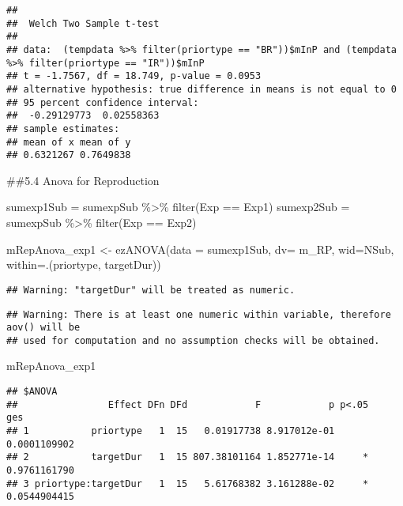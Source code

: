 \documentclass[
]{article}
\newenvironment{Shaded}{\begin{snugshade}}{\end{snugshade}}
\newcommand{\AttributeTok}[1]{\textcolor[rgb]{0.77,0.63,0.00}{#1}}
\newcommand{\FunctionTok}[1]{\textcolor[rgb]{0.00,0.00,0.00}{#1}}
\newcommand{\NormalTok}[1]{#1}
\newcommand{\OtherTok}[1]{\textcolor[rgb]{0.56,0.35,0.01}{#1}}
\newcommand{\SpecialCharTok}[1]{\textcolor[rgb]{0.00,0.00,0.00}{#1}}
\newcommand{\StringTok}[1]{\textcolor[rgb]{0.31,0.60,0.02}{#1}}
\begin{document}
\begin{verbatim}
## 
##  Welch Two Sample t-test
## 
## data:  (tempdata %>% filter(priortype == "BR"))$mInP and (tempdata %>% filter(priortype == "IR"))$mInP
## t = -1.7567, df = 18.749, p-value = 0.0953
## alternative hypothesis: true difference in means is not equal to 0
## 95 percent confidence interval:
##  -0.29129773  0.02558363
## sample estimates:
## mean of x mean of y 
## 0.6321267 0.7649838
\end{verbatim}

\#\#5.4 Anova for Reproduction

\begin{Shaded}
\begin{Highlighting}[]
\NormalTok{sumexp1Sub }\OtherTok{=}\NormalTok{ sumexpSub }\SpecialCharTok{\%\textgreater{}\%} \FunctionTok{filter}\NormalTok{(Exp }\SpecialCharTok{==} \StringTok{\textquotesingle{}Exp1\textquotesingle{}}\NormalTok{)}
\NormalTok{sumexp2Sub }\OtherTok{=}\NormalTok{ sumexpSub }\SpecialCharTok{\%\textgreater{}\%} \FunctionTok{filter}\NormalTok{(Exp }\SpecialCharTok{==} \StringTok{\textquotesingle{}Exp2\textquotesingle{}}\NormalTok{)}

\NormalTok{mRepAnova\_exp1 }\OtherTok{\textless{}{-}} \FunctionTok{ezANOVA}\NormalTok{(}\AttributeTok{data =}\NormalTok{ sumexp1Sub, }\AttributeTok{dv=}\NormalTok{ m\_RP, }\AttributeTok{wid=}\NormalTok{NSub, }\AttributeTok{within=}\NormalTok{.(priortype, targetDur))}
\end{Highlighting}
\end{Shaded}

\begin{verbatim}
## Warning: "targetDur" will be treated as numeric.
\end{verbatim}

\begin{verbatim}
## Warning: There is at least one numeric within variable, therefore aov() will be
## used for computation and no assumption checks will be obtained.
\end{verbatim}

\begin{Shaded}
\begin{Highlighting}[]
\NormalTok{mRepAnova\_exp1}
\end{Highlighting}
\end{Shaded}

\begin{verbatim}
## $ANOVA
##                Effect DFn DFd            F            p p<.05          ges
## 1           priortype   1  15   0.01917738 8.917012e-01       0.0001109902
## 2           targetDur   1  15 807.38101164 1.852771e-14     * 0.9761161790
## 3 priortype:targetDur   1  15   5.61768382 3.161288e-02     * 0.0544904415
\end{verbatim}
\end{document}
